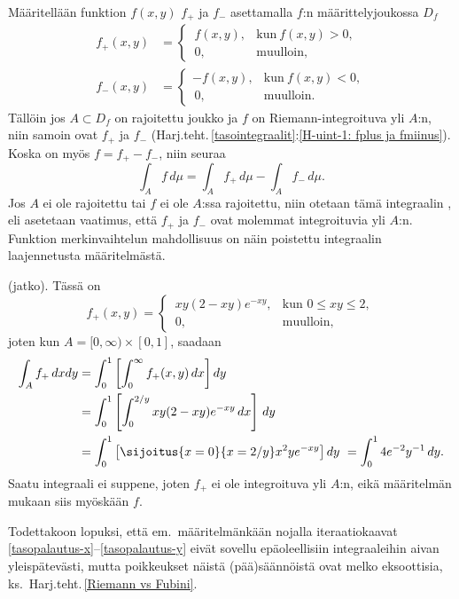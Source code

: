 Määritellään funktion $f(x,y)$  $f_+$ ja  $f_-$
asettamalla $f$:n määrittelyjoukossa $D_f$
\[
\begin{aligned}
f_+(x,y) &= \begin{cases} 
              \,f(x,y), &\text{kun}\ f(x,y)>0, \\ 
              \,0, &\text{muulloin}, 
            \end{cases} \\
f_-(x,y) &= \begin{cases} -f(x,y), &\text{kun}\ f(x,y)<0, \\ 
                          \,0, &\text{muulloin}. 
            \end{cases}
\end{aligned}
\]
Tällöin jos $A\subset D_f$ on rajoitettu joukko ja $f$ on Riemann-integroituva yli $A$:n, niin
samoin ovat $f_+$ ja $f_-$ (Harj.teht.\,\ref{tasointegraalit}:\ref{H-uint-1: fplus ja fmiinus}).
Koska on myös $f=f_+-f_-$, niin seuraa
\[
\int_A f\,d\mu=\int_A f_+\,d\mu-\int_A f_-\,d\mu.
\]
Jos $A$ ei ole rajoitettu tai $f$ ei ole $A$:ssa rajoitettu, niin otetaan tämä integraalin
, eli asetetaan vaatimus, että $f_+$ ja $f_-$ ovat molemmat integroituvia
yli $A$:n. Funktion merkinvaihtelun mahdollisuus on näin poistettu integraalin laajennetusta
määritelmästä.
\jatko \begin{Exa} (jatko). Tässä on
\[
f_+(x,y)=\begin{cases} 
          \,xy(2-xy)e^{-xy}, &\text{kun } 0 \le xy \le 2, \\ \,0, &\text{muulloin}, 
         \end{cases}
\]
joten kun $A=[0,\infty)\times [0,1]$, saadaan
\begin{align*}
\int_A f_+\,dxdy &= \int_0^1 \left[\int_0^\infty f_+(x,y)\,dx\right]dy \\
                 &= \int_0^1 \left[\int_0^{2/y} xy(2-xy)e^{-xy}\,dx\right]\,dy \\
                 &=\int_0^1 \left[\sijoitus{x=0}{x=2/y} x^2ye^{-xy}\right]dy\,
                \,=\int_0^1 4e^{-2}y^{-1}\,dy.
\end{align*}
Saatu integraali ei suppene, joten $f_+$ ei ole integroituva yli $A$:n, eikä määritelmän mukaan
siis myöskään $f$. \loppu
\end{Exa}
Todettakoon lopuksi, että em.\ määritelmänkään nojalla iteraatiokaavat
\eqref{tasopalautus-x}--\eqref{tasopalautus-y} eivät sovellu epäoleellisiin integraaleihin
aivan yleispätevästi, mutta poikkeukset näistä (pää)säännöistä ovat melko eksoottisia,
ks.\ Harj.teht.\,\ref{Riemann vs Fubini}.

